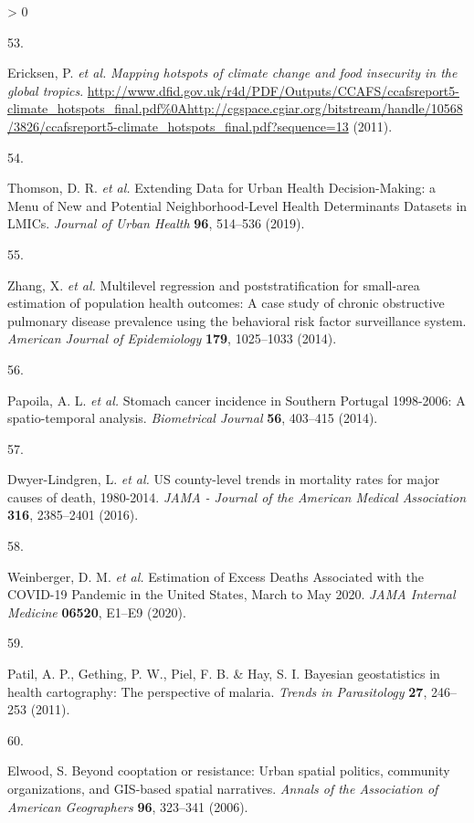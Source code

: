 \documentclass[
]{article}
\newlength{\cslhangindent}
\newlength{\csllabelwidth}
\newenvironment{CSLReferences}[2] %
 {%
  \setlength{\parindent}{0pt}
  \ifodd #1 \everypar{\setlength{\hangindent}{\cslhangindent}}\ignorespaces\fi
  \ifnum #2 > 0
  \setlength{\parskip}{#2\baselineskip}
  \fi
 }%
 {}
\newcommand{\CSLLeftMargin}[1]{\parbox[t]{\csllabelwidth}{#1}}
\newcommand{\CSLRightInline}[1]{\parbox[t]{\linewidth - \csllabelwidth}{#1}\break}
\begin{document}
\begin{CSLReferences}{0}{0}
\leavevmode\hypertarget{ref-Ericksen2011}{}%
\CSLLeftMargin{53. }
\CSLRightInline{Ericksen, P. \emph{et al.} \emph{{Mapping hotspots of climate change and food insecurity in the global tropics}}. \url{http://www.dfid.gov.uk/r4d/PDF/Outputs/CCAFS/ccafsreport5-climate_hotspots_final.pdf\%0Ahttp://cgspace.cgiar.org/bitstream/handle/10568/3826/ccafsreport5-climate_hotspots_final.pdf?sequence=13} (2011).}

\leavevmode\hypertarget{ref-Thomson2019}{}%
\CSLLeftMargin{54. }
\CSLRightInline{Thomson, D. R. \emph{et al.} {Extending Data for Urban Health Decision-Making: a Menu of New and Potential Neighborhood-Level Health Determinants Datasets in LMICs}. \emph{Journal of Urban Health} \textbf{96}, 514--536 (2019).}

\leavevmode\hypertarget{ref-Zhang2014}{}%
\CSLLeftMargin{55. }
\CSLRightInline{Zhang, X. \emph{et al.} {Multilevel regression and poststratification for small-area estimation of population health outcomes: A case study of chronic obstructive pulmonary disease prevalence using the behavioral risk factor surveillance system}. \emph{American Journal of Epidemiology} \textbf{179}, 1025--1033 (2014).}

\leavevmode\hypertarget{ref-Papoila2014}{}%
\CSLLeftMargin{56. }
\CSLRightInline{Papoila, A. L. \emph{et al.} {Stomach cancer incidence in Southern Portugal 1998-2006: A spatio-temporal analysis}. \emph{Biometrical Journal} \textbf{56}, 403--415 (2014).}

\leavevmode\hypertarget{ref-Dwyer-Lindgren2016}{}%
\CSLLeftMargin{57. }
\CSLRightInline{Dwyer-Lindgren, L. \emph{et al.} {US county-level trends in mortality rates for major causes of death, 1980-2014}. \emph{JAMA - Journal of the American Medical Association} \textbf{316}, 2385--2401 (2016).}

\leavevmode\hypertarget{ref-Weinberger2020a}{}%
\CSLLeftMargin{58. }
\CSLRightInline{Weinberger, D. M. \emph{et al.} {Estimation of Excess Deaths Associated with the COVID-19 Pandemic in the United States, March to May 2020}. \emph{JAMA Internal Medicine} \textbf{06520}, E1--E9 (2020).}

\leavevmode\hypertarget{ref-Patil2011}{}%
\CSLLeftMargin{59. }
\CSLRightInline{Patil, A. P., Gething, P. W., Piel, F. B. \& Hay, S. I. {Bayesian geostatistics in health cartography: The perspective of malaria}. \emph{Trends in Parasitology} \textbf{27}, 246--253 (2011).}

\leavevmode\hypertarget{ref-Elwood2006}{}%
\CSLLeftMargin{60. }
\CSLRightInline{Elwood, S. {Beyond cooptation or resistance: Urban spatial politics, community organizations, and GIS-based spatial narratives}. \emph{Annals of the Association of American Geographers} \textbf{96}, 323--341 (2006).}


\end{CSLReferences}
\end{document}
